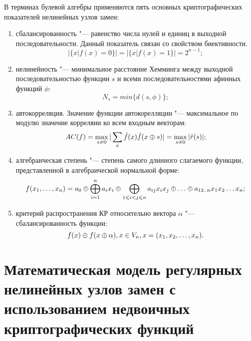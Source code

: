 В терминах булевой алгебры применяются пять основных криптографических
показателей нелинейных узлов замен:

\begin{enumerate}

    \item сбалансированность "--- равенство числа нулей и единиц в выходной последовательности.
    Данный показатель связан со свойством биективности.
    \begin{equation}|\{x | f(x) = 0\}| = |\{x | f(x) = 1\}| = 2^{n - 1};\end{equation}
    
    \item нелинейность "--- минимальное расстояние Хемминга между выходной последовательностью
    функции $s$ и всеми последовательностями афинных функций $\phi$:
    \begin{equation}N_s=min\{d(s,\phi)\};\end{equation}

    \item автокорреляция. Значение функции автокорелляции "--- максимальное по модулю значение
    корреляии ко всем входным векторам:
    \begin{equation}AC(f) = \max_{s \neq 0}|\sum_{x}\hat{f}(x)\hat{f}(x \oplus s)| = \max_{s \neq 0}|\hat{r}(s)|;\end{equation}

    \item алгебраическая степень "--- степень самого длинного слагаемого функции, представленной
    в алгебраической нормальной форме:
    \begin{equation}f(x_1, \ldots ,x_n) = a_0 \oplus \bigoplus_{i=1}^{n}a_ix_i \oplus \bigoplus_{1 \leqslant i < j \leqslant n}a_{ij}x_ix_j \oplus \ldots \oplus a_{12..n}x_1x_2 \ldots x_n;\end{equation}

    \item критерий распространения КР относительно вектора $\alpha$ "--- сбалансированность функции:
    \begin{equation}f(x) \oplus f(x \oplus \alpha), x \in V_n, x = (x_1, x_2, \ldots , x_n).\end{equation}

\end{enumerate}

\section{Математическая модель регулярных нелинейных узлов замен с
использованием недвоичных криптографических функций}

